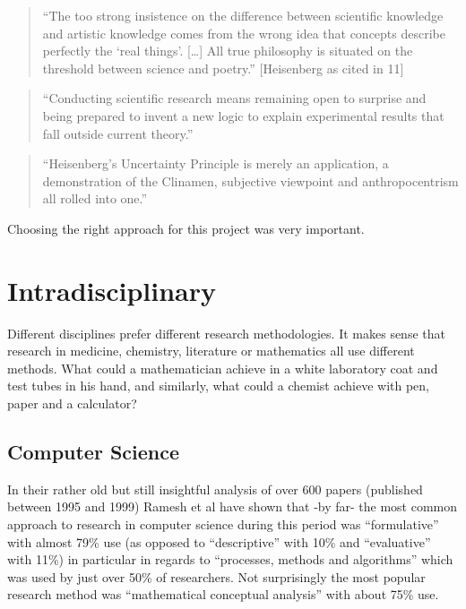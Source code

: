 \begin{quote}
  ``The too strong insistence on the difference between scientific knowledge and artistic knowledge comes from the wrong idea that concepts describe perfectly the `real things'. […] All true philosophy is situated on the threshold between science and poetry.'' [Heisenberg as cited in 11] 
\end{quote}

\begin{quote}
  ``Conducting scientific research means remaining open to surprise and being prepared to invent a new logic to explain experimental results that fall outside current theory.'' \autocite{Jarry2006}
\end{quote}

\begin{quote}
  ``Heisenberg’s Uncertainty Principle is merely an application, a demonstration of the Clinamen, subjective viewpoint and anthropocentrism all rolled into one.'' \autocite{Jarry2006}
\end{quote}

Choosing the right approach for this project was very important.



\section{Intradisciplinary}

Different disciplines prefer different research methodologies. It makes sense that research in medicine, chemistry, literature or mathematics all use different methods. What could a mathematician achieve in a white laboratory coat and test tubes in his hand, and similarly, what could a chemist achieve with pen, paper and a calculator?


\subsection{Computer Science}

In their rather old but still insightful analysis of over 600 papers (published between 1995 and 1999) Ramesh et al \autocite{Ramesh2004} have shown that -by far- the most common approach to research in computer science during this period was ``formulative'' with almost 79\% use (as opposed to ``descriptive'' with 10\% and ``evaluative'' with 11\%) in particular in regards to ``processes, methods and algorithms'' which was used by just over 50\% of researchers. Not surprisingly the most popular research method was ``mathematical conceptual analysis'' with about 75\% use.

